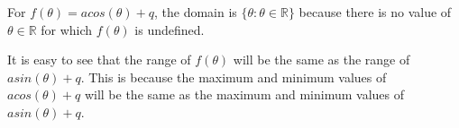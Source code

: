           
          \label{m39414*id88263}For \begin{math}f\left(\theta \right)=acos\left(\theta \right)+q\end{math}, the domain is \begin{math}\{\theta :\theta \in \mathbb{R}\}\end{math} because there is no value of \begin{math}\theta \in \mathbb{R}\end{math} for which \begin{math}f\left(\theta \right)\end{math} is undefined.\par 
          \label{m39414*id88363}It is easy to see that the range of \begin{math}f\left(\theta \right)\end{math} will be the same as the range of \begin{math}asin\left(\theta \right)+q\end{math}. This is because the maximum and minimum values of \begin{math}acos\left(\theta \right)+q\end{math} will be the same as the maximum and minimum values of \begin{math}asin\left(\theta \right)+q\end{math}.\par 
        
        \label{m39414*uid67}
            \nopagebreak
            
